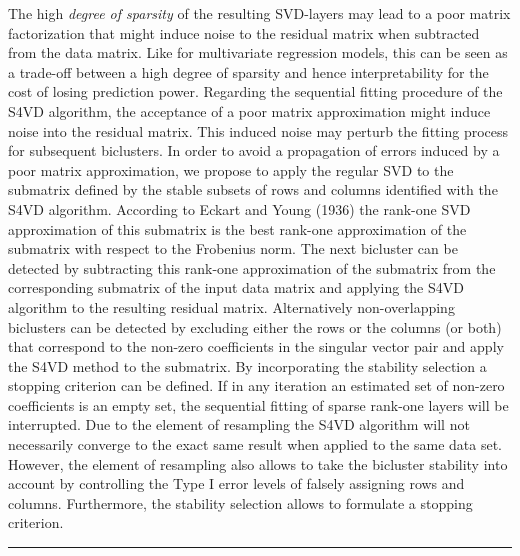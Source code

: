 The high \textit{degree of sparsity} of the resulting SVD-layers may lead to a poor matrix factorization that might induce noise to the residual matrix when subtracted from the data matrix. Like for multivariate regression models, this can be seen as a trade-off between a high degree of sparsity and hence interpretability for the cost of losing prediction power. Regarding the sequential fitting procedure of the S4VD algorithm, the acceptance of a poor matrix approximation might induce noise into the residual matrix. This induced noise may perturb the fitting process for subsequent biclusters. In order to avoid a propagation of errors induced by a poor matrix approximation, we propose to apply the regular SVD to the submatrix defined by the stable subsets of rows and columns identified with the S4VD algorithm. According to Eckart and Young (1936) the rank-one SVD approximation of this submatrix is the best rank-one approximation of the submatrix with respect to the Frobenius norm. The next bicluster can be detected by subtracting this rank-one approximation of the submatrix from the corresponding submatrix of the input data matrix and applying the S4VD algorithm to the resulting residual matrix. 
Alternatively non-overlapping biclusters can be detected by excluding either the rows or the columns (or both) that correspond to the non-zero coefficients in the singular vector pair and apply the S4VD method to the submatrix. By incorporating the stability selection a stopping criterion can be defined. If in any iteration an estimated set of non-zero coefficients is an empty set, the sequential fitting of sparse rank-one layers will be interrupted. 
Due to the element of resampling the S4VD algorithm will not necessarily converge to the exact same result when applied to the same data set. However, the element of resampling also allows to take the bicluster stability into account by controlling the Type I error levels of falsely assigning rows and columns. Furthermore, the stability selection allows to formulate a stopping criterion.
\\
\newpage
\hspace{-0.1cm} 
\rule{14.75 cm}{1pt}

